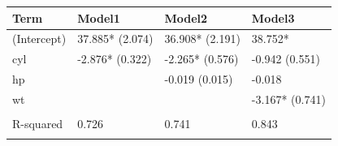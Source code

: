 \documentclass{article}
\begin{document}
\thispagestyle{empty}

\begin{table}
\centering
\begin{tabular}{llll}
\toprule
\textbf{Term} & \textbf{Model1} & \textbf{Model2} & \textbf{Model3}\\
\midrule
(Intercept) & 37.885*
(2.074) & 36.908*
(2.191) & 38.752*
\cellcolor{blue!10}{(1.787)}\\
cyl & -2.876*
(0.322) & -2.265*
(0.576) & -0.942
(0.551)\\
hp &  & -0.019
(0.015) & -0.018
\cellcolor{blue!10}{(0.012)}\\
wt &  &  & -3.167*
(0.741)\\
\cellcolor{blue!10}{N} & \cellcolor{blue!10}{32} & \cellcolor{blue!10}{32} & \cellcolor{blue!10}{32}\\
\addlinespace
R-squared & 0.726 & 0.741 & 0.843\\
\cellcolor{blue!10}{Adj. R-squared} & \cellcolor{blue!10}{0.717} & \cellcolor{blue!10}{0.723} & \cellcolor{blue!10}{0.826}\\
\bottomrule
\end{tabular}
\end{table}
\end{document}
